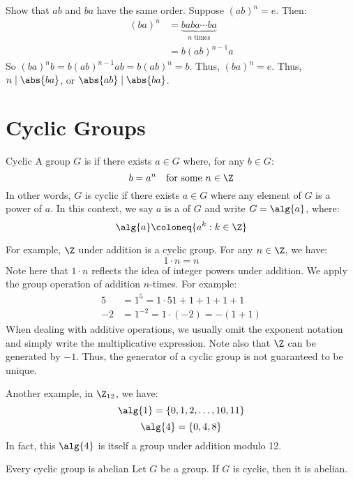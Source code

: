 \begin{exbox}{}{}
    Show that $ab$ and $ba$ have the same order.
    \tcblower
    Suppose $(ab)^n = e$. Then:
    \begin{align*}
        (ba)^n &= \underbrace{baba \cdots ba}_\text{$n$ times} \\
        &= b(ab)^{n-1}a
    \end{align*}
    So $(ba)^n b = b(ab)^{n-1}ab = b(ab)^n = b$. Thus, $(ba)^n = e$. Thus, $n \mid \abs{ba}$, or $\abs{ab} \mid \abs{ba}$.
\end{exbox}

\section{Cyclic Groups}

\begin{dfnbox}{Cyclic}{}
    A group $G$ is  if there exists $a \in G$ where, for any $b \in G$:
    \[ b = a^n \quad \text{for some}\ n \in \Z \]
    In other words, $G$ is cyclic if there exists $a \in G$ where any element of $G$ is a power of $a$. In this context, we say $a$ is a  of $G$ and write $G = \alg{a}$, where:
    \[ \alg{a} \coloneq \{ a^k : k \in \Z \} \]
\end{dfnbox}

For example, $\Z$ under addition is a cyclic group. For any $n \in \Z$, we have:
\[ 1 \cdot n = n \]
Note here that $1 \cdot n$ reflects the idea of integer powers under addition. We apply the group operation of addition $n$-times. For example:
\begin{align*}
    5 &= 1^5 = 1 \cdot 5 1 + 1 + 1 + 1 + 1 \\
    -2 &= 1^{-2} = 1 \cdot (-2) = - (1 + 1)
\end{align*}
When dealing with additive operations, we usually omit the exponent notation and simply write the multiplicative expression. Note also that $\Z$ can be generated by $-1$. Thus, the generator of a cyclic group is not guaranteed to be unique.

Another example, in $\Z_{12}$, we have:
\[ \alg{1} = \{0, 1, 2, \ldots, 10, 11\} \]
\[ \alg{4} = \{0, 4, 8\} \]
In fact, this $\alg{4}$ is itself a group under addition modulo 12.

\begin{thmbox}{Every cyclic group is abelian}{}
    Let $G$ be a group. If $G$ is cyclic, then it is abelian.
\end{thmbox}

